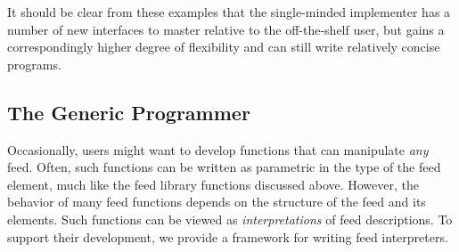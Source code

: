 It should be clear from these examples that the single-minded implementer
has a number of new interfaces to master relative to the off-the-shelf
user, but gains a correspondingly higher degree of flexibility and can
still write relatively concise programs.


\subsection{The Generic Programmer}


Occasionally, users might want to develop functions that can
manipulate {\it any} feed. 
Often, such functions can be written as
parametric in the type of the feed element, much like the feed
library functions discussed above. However, the behavior of many feed
functions depends on the structure of the feed and its
elements. Such functions can be viewed as {\it interpretations} of
feed descriptions. To support their development, we provide a
framework for writing feed interpreters.


